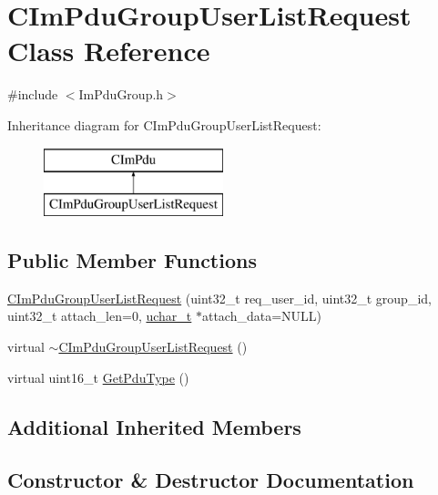 \hypertarget{class_c_im_pdu_group_user_list_request}{}\section{C\+Im\+Pdu\+Group\+User\+List\+Request Class Reference}
\label{class_c_im_pdu_group_user_list_request}


{\ttfamily \#include $<$Im\+Pdu\+Group.\+h$>$}

Inheritance diagram for C\+Im\+Pdu\+Group\+User\+List\+Request\+:\begin{figure}[H]
\begin{center}
\leavevmode
\includegraphics[height=2.000000cm]{class_c_im_pdu_group_user_list_request}
\end{center}
\end{figure}
\subsection*{Public Member Functions}
\begin{DoxyCompactItemize}
\item 
\hyperlink{class_c_im_pdu_group_user_list_request_a4c02dec98664061e2920823b925842ac}{C\+Im\+Pdu\+Group\+User\+List\+Request} (uint32\+\_\+t req\+\_\+user\+\_\+id, uint32\+\_\+t group\+\_\+id, uint32\+\_\+t attach\+\_\+len=0, \hyperlink{base_2ostype_8h_a124ea0f8f4a23a0a286b5582137f0b8d}{uchar\+\_\+t} $\ast$attach\+\_\+data=N\+U\+L\+L)
\item 
virtual \hyperlink{class_c_im_pdu_group_user_list_request_a5ac71538096f0d9c7ed42a9c5f1fc6f4}{$\sim$\+C\+Im\+Pdu\+Group\+User\+List\+Request} ()
\item 
virtual uint16\+\_\+t \hyperlink{class_c_im_pdu_group_user_list_request_a302bc21ca461fd98a032944414525b58}{Get\+Pdu\+Type} ()
\end{DoxyCompactItemize}
\subsection*{Additional Inherited Members}


\subsection{Constructor \& Destructor Documentation}
\hypertarget{class_c_im_pdu_group_user_list_request_a4c02dec98664061e2920823b925842ac}{}
